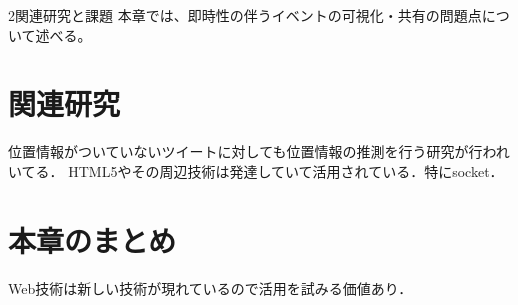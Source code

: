 \chapterhead
{2}{関連研究と課題}
{本章では、即時性の伴うイベントの可視化・共有の問題点について述べる。}

\section{関連研究}
位置情報がついていないツイートに対しても位置情報の推測を行う研究が行われいてる．\cite{inproceedings4}
HTML5やその周辺技術は発達していて活用されている\cite{inproceedings1}．特にsocket\cite{inproceedings3}．

\section{本章のまとめ}
Web技術は新しい技術が現れているので活用を試みる価値あり．
